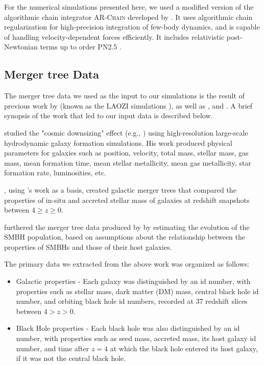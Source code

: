 \documentclass[fleqn,usenatbib,useAMS]{mnras}
\begin{document}
For the numerical simulations presented here, we used a modified version of the algorithmic chain integrator \textsc{AR-Chain} developed by \citet{2006MNRAS.372..219M}. It uses algorithmic chain regularization for high-precision integration of few-body dynamics, and is capable of handling velocity-dependent forces efficiently. It includes relativistic post-Newtonian terms up to order PN2.5 \citep{2008AJ....135.2398M}.


\subsection{Merger tree Data}
The merger tree data we used as the input to our simulations is the result of previous work by \citet{2011ApJ...741...99C, 2011ApJ...742L..33C, 2012ApJ...753...17C, 2012ApJ...748..121C, 2013ApJ...770..139C}  (known as the LAOZI simulations \citealt{2014ApJ...781...38C}), as well as  \citet{2012MNRAS.425..641L}, and \citet{2015ApJ...799..178K}.  A brief synopsis of the work that led to our input data is described below.

\citet{2011ApJ...741...99C} studied the "cosmic downsizing" effect (e.g., \citealt{1996AJ....112..839C}) using high-resolution large-scale hydrodynamic galaxy formation simulations.  His work produced physical parameters for galaxies such as position, velocity, total mass, stellar mass, gas mass, mean formation time, mean stellar metallicity, mean gas metallicity, star formation rate, luminosities, etc.

\citet{2012MNRAS.425..641L}, using \citet{2011ApJ...741...99C}'s work as a basis, created galactic merger trees that compared the properties of in-situ and accreted stellar mass of galaxies at redshift snapshots between $4 \geq z \geq 0$.

\citet{2015ApJ...799..178K} furthered the merger tree data produced by \citet{2012MNRAS.425..641L} by estimating the evolution of the SMBH population, based on assumptions about the relationship between the properties of SMBHs and those of their host galaxies.

The primary data we extracted from the above work was organized as follows:
\begin{itemize}
    \item Galactic properties - Each galaxy was distinguished by an id number, with properties such as stellar mass, dark matter (DM) mass, central black hole id number, and orbiting black hole id numbers, recorded at 37 redshift slices between $4 > z > 0$.
    \item Black Hole properties - Each black hole was also distinguished by an id number, with properties such as seed mass, accreted mass, its host galaxy id number, and time after $z=4$ at which the black hole entered its host galaxy, if it was not the central black hole.
\end{itemize}
\end{document}
